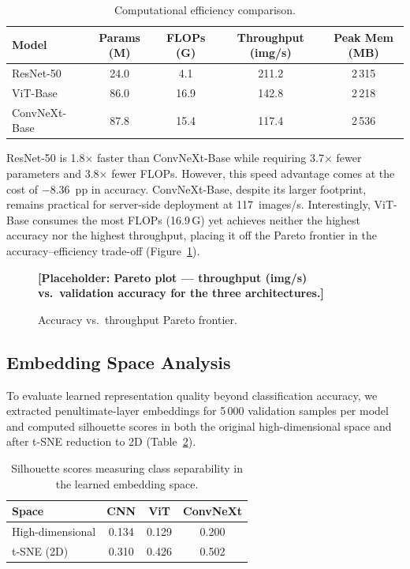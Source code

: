 \begin{table}[ht]
\centering
\caption{Computational efficiency comparison.}
\label{tab:efficiency}
\begin{tabular}{lcccc}
\toprule
\textbf{Model} & \textbf{Params (M)} & \textbf{FLOPs (G)} &
  \textbf{Throughput (img/s)} & \textbf{Peak Mem (MB)} \\
\midrule
ResNet-50     & 24.0  & 4.1  & 211.2 & 2\,315 \\
ViT-Base      & 86.0  & 16.9 & 142.8 & 2\,218 \\
ConvNeXt-Base & 87.8  & 15.4 & 117.4 & 2\,536 \\
\bottomrule
\end{tabular}
\end{table}

ResNet-50 is 1.8$\times$ faster than ConvNeXt-Base while requiring
3.7$\times$ fewer parameters and 3.8$\times$ fewer FLOPs.  However,
this speed advantage comes at the cost of $-8.36$~pp in accuracy.
ConvNeXt-Base, despite its larger footprint, remains practical for
server-side deployment at 117~images/s.  Interestingly, ViT-Base
consumes the most FLOPs (16.9\,G) yet achieves neither the highest
accuracy nor the highest throughput, placing it off the Pareto frontier
in the accuracy--efficiency trade-off (Figure~\ref{fig:pareto}).

\begin{figure}[ht]
\centering
\textbf{[Placeholder: Pareto plot --- throughput (img/s) vs.\ validation
accuracy for the three architectures.]}
\caption{Accuracy vs.\ throughput Pareto frontier.}
\label{fig:pareto}
\end{figure}

\subsection{Embedding Space Analysis}\label{sec:embeddings}

To evaluate learned representation quality beyond classification
accuracy, we extracted penultimate-layer embeddings for 5\,000
validation samples per model and computed silhouette scores in both
the original high-dimensional space and after t-SNE reduction to 2D
(Table~\ref{tab:silhouette}).

\begin{table}[ht]
\centering
\caption{Silhouette scores measuring class separability in the learned
         embedding space.}
\label{tab:silhouette}
\begin{tabular}{lccc}
\toprule
\textbf{Space} & \textbf{CNN} & \textbf{ViT} & \textbf{ConvNeXt} \\
\midrule
High-dimensional & 0.134 & 0.129 & 0.200 \\
t-SNE (2D)       & 0.310 & 0.426 & 0.502 \\
\bottomrule
\end{tabular}
\end{table}

